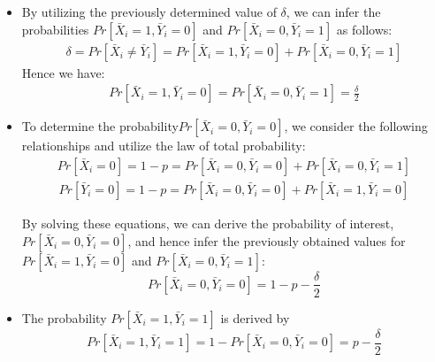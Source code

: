 \begin{itemize}
    \item By utilizing the previously determined value of $\delta$, we can infer the probabilities \(Pr[\bar{X}_i = 1, \bar{Y}_i = 0]\) and \(Pr[\bar{X}_i = 0, \bar{Y}_i = 1]\) as follows: 
    \begin{equation*}
        \begin{aligned}
            \delta = Pr[\bar{X}_i \neq \bar{Y}_i] = Pr[\bar{X}_i = 1, \bar{Y}_i = 0] + Pr[\bar{X}_i = 0, \bar{Y}_i = 1]
        \end{aligned}
    \end{equation*}
    Hence we have:
    \begin{equation*}
        \begin{aligned}
            Pr[\bar{X}_i = 1, \bar{Y}_i = 0] = Pr[\bar{X}_i = 0, \bar{Y}_i = 1] = \frac{\delta}{2}
        \end{aligned}
    \end{equation*}
    \item To determine the probability\(Pr[\bar{X}_i = 0, \bar{Y}_i = 0]\), we consider the following relationships and utilize the law of total probability:
    \begin{equation*}
        \begin{aligned}
            Pr[\bar{X}_i = 0] = 1-p = Pr[\bar{X}_i = 0, \bar{Y}_i = 0] + Pr[\bar{X}_i = 0, \bar{Y}_i = 1]
        \end{aligned}
    \end{equation*} 
    \begin{equation*}
        \begin{aligned}
            Pr[\bar{Y}_i = 0] = 1-p = Pr[\bar{X}_i = 0, \bar{Y}_i = 0] + Pr[\bar{X}_i = 1, \bar{Y}_i = 0]
        \end{aligned}
    \end{equation*} 
    
    By solving these equations, we can derive the probability of interest, \\\(Pr[\bar{X}_i = 0, \bar{Y}_i = 0]\), and hence infer the previously obtained values for \\\(Pr[\bar{X}_i = 1, \bar{Y}_i = 0]\) and \(Pr[\bar{X}_i = 0, \bar{Y}_i = 1]\):
    \[ Pr[\bar{X}_i = 0, \bar{Y}_i = 0] = 1-p - \frac{\delta}{2} \] 

    \item The probability \(Pr[\bar{X}_i = 1, \bar{Y}_i = 1]\) is derived by 
    \[Pr[\bar{X}_i = 1, \bar{Y}_i = 1] = 1 - Pr[\bar{X}_i = 0, \bar{Y}_i = 0] = p-\frac{\delta}{2}\]

\end{itemize}

